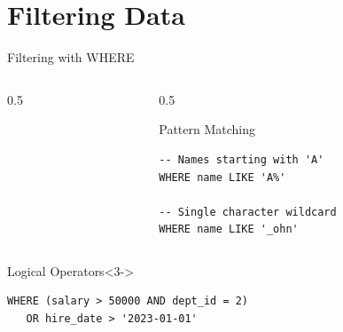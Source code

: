 \documentclass[aspectratio=169,11pt]{beamer}
\begin{document}
\section{Filtering Data}
\begin{frame}[fragile]{Filtering with WHERE}
\begin{columns}[T]
\begin{column}{0.5\textwidth}
\end{column}
\pause
\begin{column}{0.5\textwidth}
\begin{exampleblock}{Pattern Matching}
\begin{lstlisting}
-- Names starting with 'A'
WHERE name LIKE 'A%'

-- Single character wildcard
WHERE name LIKE '_ohn'
\end{lstlisting}
\end{exampleblock}
\end{column}
\end{columns}

\pause
\begin{alertblock}{Logical Operators}<3->
\begin{lstlisting}
WHERE (salary > 50000 AND dept_id = 2)
   OR hire_date > '2023-01-01'
\end{lstlisting}
\end{alertblock}
\end{frame}
\end{document}
